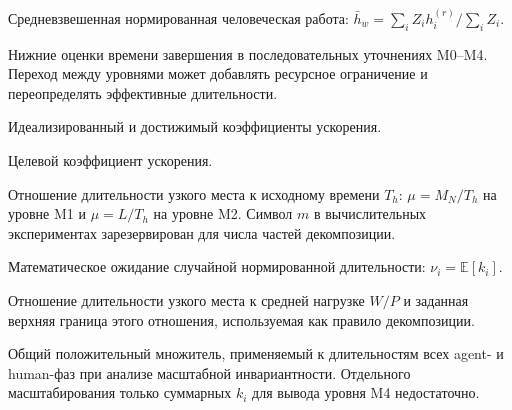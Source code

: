 \begin{description}[style=nextline]
  \item[$\bar{h}_w$] Средневзвешенная нормированная человеческая работа:
  $\bar{h}_w=\sum_i Z_i h_i^{(r)}/\sum_i Z_i$.

  \item[$B_0,\dots,B_4$] Нижние оценки времени завершения в последовательных
  уточнениях M0--M4. Переход между уровнями может добавлять ресурсное
  ограничение и переопределять эффективные длительности.

  \item[$S_E$, $S_E^{\mathrm{ach}}$] Идеализированный и достижимый
  коэффициенты ускорения.

  \item[$S_{\mathrm{target}}$] Целевой коэффициент ускорения.

  \item[$\mu$] Отношение длительности узкого места к исходному времени $T_h$:
  $\mu=M_N/T_h$ на уровне M1 и $\mu=L/T_h$ на уровне M2. Символ $m$ в
  вычислительных экспериментах зарезервирован для числа частей декомпозиции.

  \item[$\nu_i$] Математическое ожидание случайной нормированной длительности:
  $\nu_i=\mathbb{E}[k_i]$.

  \item[$b$, $b_0$] Отношение длительности узкого места к средней нагрузке
  $W/P$ и заданная верхняя граница этого отношения, используемая как правило
  декомпозиции.

  \item[$\kappa$] Общий положительный множитель, применяемый к длительностям
  всех agent- и human-фаз при анализе масштабной инвариантности. Отдельного
  масштабирования только суммарных $k_i$ для вывода уровня M4 недостаточно.
\end{description}
